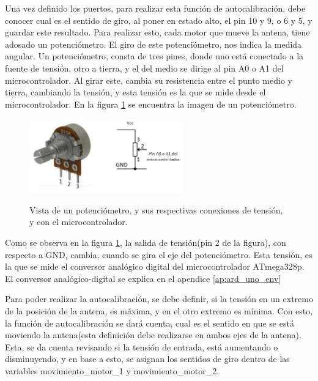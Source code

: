 Una vez definido los puertos, para realizar esta función de autocalibración, debe conocer cual es el sentido de giro, al poner en estado alto, el pin 10 y 9, o 6 y 5, y guardar este resultado. Para realizar esto, cada motor que mueve la antena, tiene adosado un potenciómetro. El giro de este potenciómetro, nos indica la medida angular. Un potenciómetro, consta de tres pines, donde uno está conectado a la fuente de tensión, otro a tierra, y el del medio se dirige al pin A0 o A1 del microcontrolador. Al girar este, cambia su resistencia entre el punto medio y tierra, cambiando la tensión, y esta tensión es la que se mide desde el microcontrolador. En la figura
\ref{fig:pot} se encuentra la imagen de un potenciómetro. 


\begin{figure}
	\centering
	\caption{Vista de un potenciómetro, y sus respectivas conexiones de tensión, y con el microcontrolador.}	
	\includegraphics[height=3.2cm]{pote}
	\label{fig:pot}	
\end{figure}

\vspace{15mm}
Como se observa en la figura \ref{fig:pot}, la salida de tensión(pin 2 de la figura), con respecto a GND, cambia, cuando se gira el eje del potenciómetro. Esta tensión, es la que se mide el conversor analógico digital del microcontrolador ATmega328p. El conversor analógico-digital se explica en el apendice \ref{ap:ard_uno_env}   

Para poder realizar la autocalibración, se debe definir, si la tensión en un extremo de la posición de la antena, es máxima, y en el otro extremo es mínima. Con esto, la función de autocalibración se dará cuenta, cual es el sentido en que se está moviendo la antena(esta definición debe realizarse en ambos ejes de la antena). Esta, se da cuenta revisando si la tensión de entrada, está aumentando o disminuyendo, y en base a esto, se asignan los sentidos de giro dentro de las variables movimiento\_motor\_1 y movimiento\_motor\_2. 

